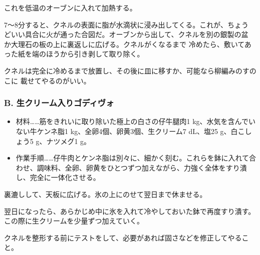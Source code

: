\begin{recette}
これを低温のオーブンに入れて加熱する。

7〜8分すると、クネルの表面に脂が水滴状に浸み出してくる。これが、ちょう
どいい具合に火が通った合図だ。オーブンから出して、クネルを別の銀製の盆
か大理石の板の上に裏返しに広げる。クネルがくなるまで
冷めたら、敷いてあった紙を端のほうから引き剥して取り除く。

クネルは完全に冷めるまで放置し、その後に皿に移すか、可能なら柳編みのすのこに
載せてやるのがいい。

\hypertarget{godiveau-a-la-creme}{%
\subsubsection{B. 生クリーム入りゴディヴォ}\label{godiveau-a-la-creme}}



\begin{itemize}
\item
  材料\ldots{}\ldots{}筋をきれいに取り除いた極上の白さの仔牛腿肉1
  kg、水気を含んでいない牛ケンネ脂1 kg、全卵4個、卵黄3個、生クリーム7
  dL、塩25 g、白こしょう5 g、ナツメグ1 g。
\item
  作業手順\ldots{}\ldots{}仔牛肉とケンネ脂は別々に、細かく刻む。これらを鉢に入れて合わせ、調味料、全卵、卵黄をひとつずつ加えながら、力強く全体をすり潰し、完全に一体化させる。
\end{itemize}

裏漉しして、天板に広げる。氷の上にのせて翌日まで休ませる。

翌日になったら、あらかじめ中に氷を入れて冷やしておいた鉢で再度すり潰す。この際に生クリームを少量ずつ加えていく。

クネルを整形する前にテストをして、必要があれば固さなどを修正してやること。

\hypertarget{godiveau-lyonnais}{%
}
\end{recette}
